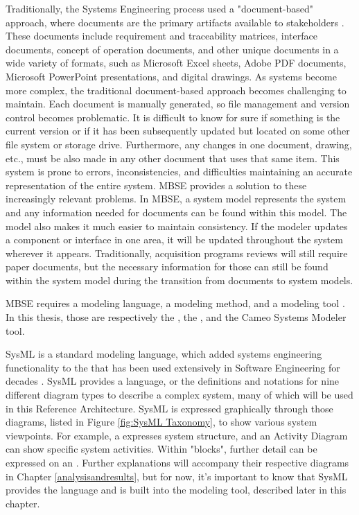 Traditionally, the Systems Engineering process used a "document-based" approach, where documents are the primary artifacts available to stakeholders \citep{Delligatti}. These documents include requirement and traceability matrices, interface documents, concept of operation documents, and other unique documents in a wide variety of formats, such as Microsoft Excel sheets, Adobe PDF documents, Microsoft PowerPoint presentations, and digital drawings. As systems become more complex, the traditional document-based approach becomes challenging to maintain. Each document is manually generated, so file management and version control becomes problematic. It is difficult to know for sure if something is the current version or if it has been subsequently updated but located on some other file system or storage drive. Furthermore, any changes in one document, drawing, etc., must be also made in any other document that uses that same item. This system is prone to errors, inconsistencies, and difficulties maintaining an accurate representation of the entire system. MBSE provides a solution to these increasingly relevant problems. In MBSE, a system model represents the system and any information needed for documents can be found within this model. The model also makes it much easier to maintain consistency. If the modeler updates a component or interface in one area, it will be updated throughout the system wherever it appears. Traditionally, acquisition programs reviews will still require paper documents, but the necessary information for those can still be found within the system model during the transition from documents to system models. 

MBSE requires a modeling language, a modeling method, and a modeling tool \citep{Delligatti}. In this thesis, those are respectively the , the , and the Cameo Systems Modeler tool.  

SysML is a standard modeling language, which added systems engineering functionality to the  that has been used extensively in Software Engineering for decades \citep{Delligatti}. SysML provides a language, or the definitions and notations for nine different diagram types to describe a complex system, many of which will be used in this Reference Architecture. SysML is expressed graphically through those diagrams, listed in Figure \ref{fig:SysML Taxonomy}, to show various system viewpoints. For example, a  expresses system structure, and an Activity Diagram can show specific system activities. Within "blocks", further detail can be expressed on an . Further explanations will accompany their respective diagrams in Chapter \ref{analysisandresults}, but for now, it's important to know that SysML provides the language and is built into the modeling tool, described later in this chapter. 

